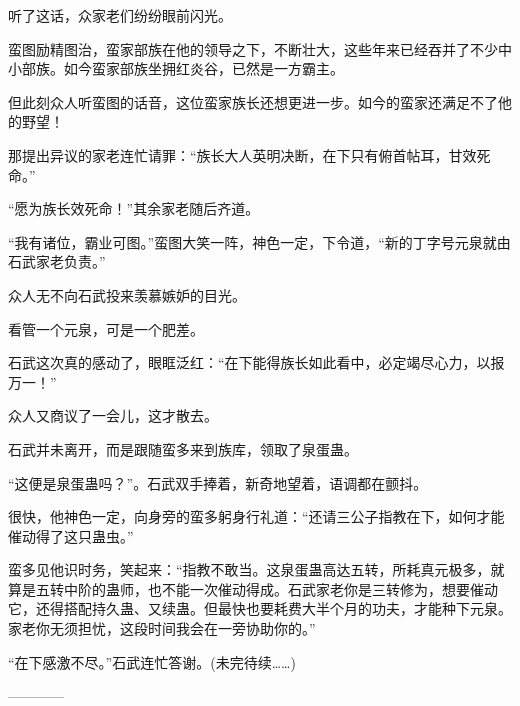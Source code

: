 \begin{this_body}
听了这话，众家老们纷纷眼前闪光。

蛮图励精图治，蛮家部族在他的领导之下，不断壮大，这些年来已经吞并了不少中小部族。如今蛮家部族坐拥红炎谷，已然是一方霸主。

但此刻众人听蛮图的话音，这位蛮家族长还想更进一步。如今的蛮家还满足不了他的野望！

那提出异议的家老连忙请罪：“族长大人英明决断，在下只有俯首帖耳，甘效死命。”

“愿为族长效死命！”其余家老随后齐道。

“我有诸位，霸业可图。”蛮图大笑一阵，神色一定，下令道，“新的丁字号元泉就由石武家老负责。”

众人无不向石武投来羡慕嫉妒的目光。

看管一个元泉，可是一个肥差。

石武这次真的感动了，眼眶泛红：“在下能得族长如此看中，必定竭尽心力，以报万一！”

众人又商议了一会儿，这才散去。

石武并未离开，而是跟随蛮多来到族库，领取了泉蛋蛊。

“这便是泉蛋蛊吗？”。石武双手捧着，新奇地望着，语调都在颤抖。

很快，他神色一定，向身旁的蛮多躬身行礼道：“还请三公子指教在下，如何才能催动得了这只蛊虫。”

蛮多见他识时务，笑起来：“指教不敢当。这泉蛋蛊高达五转，所耗真元极多，就算是五转中阶的蛊师，也不能一次催动得成。石武家老你是三转修为，想要催动它，还得搭配持久蛊、又续蛊。但最快也要耗费大半个月的功夫，才能种下元泉。家老你无须担忧，这段时间我会在一旁协助你的。”

“在下感激不尽。”石武连忙答谢。(未完待续……)

------------

\end{this_body}

